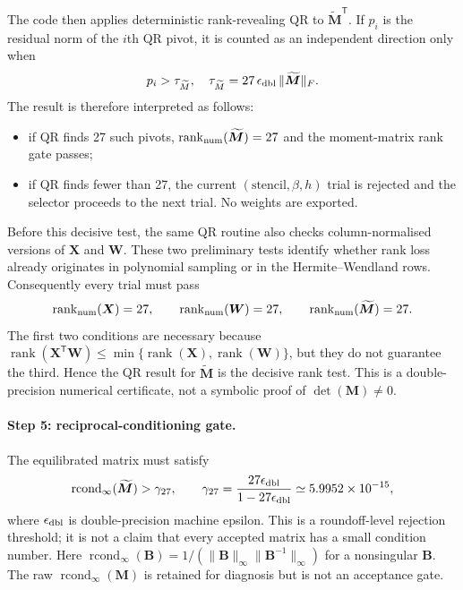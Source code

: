 \documentclass[11pt,a4paper]{article}
\begin{document}
The code then applies deterministic rank-revealing QR to
$\widetilde{\bm M}^{\mathsf T}$. If $p_i$ is the residual norm of the $i$th QR pivot, it
is counted as an independent direction only when
\begin{equation}
 p_i>\tau_{\widetilde M}, \quad
  \tau_{\widetilde M}
 =27\,\epsilon_{\rm dbl}\,\|\widetilde{\bm M}\|_F.
\label{eq:project-rank-threshold}
\end{equation}
The result is therefore interpreted as follows:
\begin{itemize}[leftmargin=2.0em]
\item if QR finds 27 such pivots,
      $\operatorname{rank}_{\rm num}(\widetilde{\bm M})=27$ and the moment-matrix
      rank gate passes;
\item if QR finds fewer than 27, the current $(\text{stencil},\beta,h)$ trial is
      rejected and the selector proceeds to the next trial. No weights are exported.
\end{itemize}

Before this decisive test, the same QR routine also checks column-normalised versions of
$\bm X$ and $\bm W$. These two preliminary tests identify whether rank loss already
originates in polynomial sampling or in the Hermite--Wendland rows. Consequently every
trial must pass
\begin{equation}
 \operatorname{rank}_{\rm num}(\bm X)=27,\qquad
 \operatorname{rank}_{\rm num}(\bm W)=27,\qquad
 \operatorname{rank}_{\rm num}(\widetilde{\bm M})=27.
\label{eq:three-ranks}
\end{equation}
The first two conditions are necessary because
$\operatorname{rank}(\bm X^{\mathsf T}\bm W)
\le\min\{\operatorname{rank}(\bm X),\operatorname{rank}(\bm W)\}$, but they do not
guarantee the third. Hence the QR result for $\widetilde{\bm M}$ is the decisive rank
test. This is a double-precision numerical certificate, not a symbolic proof of
$\det(\bm M)\ne0$.

\paragraph{Step 5: reciprocal-conditioning gate.}
The equilibrated matrix must satisfy
\begin{equation}
 \operatorname{rcond}_{\infty}(\widetilde{\bm M})>\gamma_{27},\qquad
 \gamma_{27}=
 \frac{27\epsilon_{\rm dbl}}{1-27\epsilon_{\rm dbl}}
 \simeq5.9952\times10^{-15},
\label{eq:project-rcond}
\end{equation}
where $\epsilon_{\rm dbl}$ is double-precision machine epsilon. This is a
roundoff-level rejection threshold; it is not a claim that every accepted matrix has a
small condition number. Here
$\operatorname{rcond}_{\infty}(\bm B)=
1/(\|\bm B\|_\infty\|\bm B^{-1}\|_\infty)$ for a nonsingular $\bm B$.
The raw $\operatorname{rcond}_{\infty}(\bm M)$ is retained for diagnosis but is not an
acceptance gate.
\end{document}
